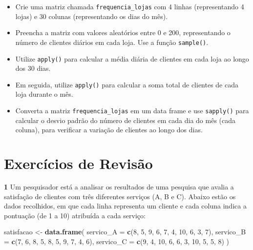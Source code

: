 \documentclass[
]{book}
\newenvironment{Shaded}{\begin{snugshade}}{\end{snugshade}}
\newcommand{\AttributeTok}[1]{\textcolor[rgb]{0.13,0.29,0.53}{#1}}
\newcommand{\DecValTok}[1]{\textcolor[rgb]{0.00,0.00,0.81}{#1}}
\newcommand{\FunctionTok}[1]{\textcolor[rgb]{0.13,0.29,0.53}{\textbf{#1}}}
\newcommand{\NormalTok}[1]{#1}
\newcommand{\OtherTok}[1]{\textcolor[rgb]{0.56,0.35,0.01}{#1}}
\providecommand{\tightlist}{%
  \setlength{\itemsep}{0pt}\setlength{\parskip}{0pt}}
\begin{document}
\begin{itemize}
\tightlist
\item
  Crie uma matriz chamada \texttt{frequencia\_lojas} com 4 linhas (representando 4 lojas) e 30 colunas (representando os dias do mês).
\item
  Preencha a matriz com valores aleatórios entre 0 e 200, representando o número de clientes diários em cada loja. Use a função \texttt{sample()}.
\item
  Utilize \texttt{apply()} para calcular a média diária de clientes em cada loja ao longo dos 30 dias.
\item
  Em seguida, utilize \texttt{apply()} para calcular a soma total de clientes de cada loja durante o mês.
\item
  Converta a matriz \texttt{frequencia\_lojas} em um data frame e use \texttt{sapply()} para calcular o desvio padrão do número de clientes em cada dia do mês (cada coluna), para verificar a variação de clientes ao longo dos dias.
\end{itemize}

\chapter{Exercícios de Revisão}\label{exercuxedcios-de-revisuxe3o}

\textbf{1} Um pesquisador está a analisar os resultados de uma pesquisa que avalia a satisfação de clientes com três diferentes serviços (A, B e C). Abaixo estão os dados recolhidos, em que cada linha representa um cliente e cada coluna indica a pontuação (de 1 a 10) atribuída a cada serviço:

\begin{Shaded}
\begin{Highlighting}[]
\NormalTok{satisfacao }\OtherTok{\textless{}{-}} \FunctionTok{data.frame}\NormalTok{(}
  \AttributeTok{servico\_A =} \FunctionTok{c}\NormalTok{(}\DecValTok{8}\NormalTok{, }\DecValTok{5}\NormalTok{, }\DecValTok{9}\NormalTok{, }\DecValTok{6}\NormalTok{, }\DecValTok{7}\NormalTok{, }\DecValTok{4}\NormalTok{, }\DecValTok{10}\NormalTok{, }\DecValTok{6}\NormalTok{, }\DecValTok{3}\NormalTok{, }\DecValTok{7}\NormalTok{),}
  \AttributeTok{servico\_B =} \FunctionTok{c}\NormalTok{(}\DecValTok{7}\NormalTok{, }\DecValTok{6}\NormalTok{, }\DecValTok{8}\NormalTok{, }\DecValTok{5}\NormalTok{, }\DecValTok{8}\NormalTok{, }\DecValTok{5}\NormalTok{, }\DecValTok{9}\NormalTok{, }\DecValTok{7}\NormalTok{, }\DecValTok{4}\NormalTok{, }\DecValTok{6}\NormalTok{),}
  \AttributeTok{servico\_C =} \FunctionTok{c}\NormalTok{(}\DecValTok{9}\NormalTok{, }\DecValTok{4}\NormalTok{, }\DecValTok{10}\NormalTok{, }\DecValTok{6}\NormalTok{, }\DecValTok{6}\NormalTok{, }\DecValTok{3}\NormalTok{, }\DecValTok{10}\NormalTok{, }\DecValTok{5}\NormalTok{, }\DecValTok{5}\NormalTok{, }\DecValTok{8}\NormalTok{)}
\NormalTok{)}
\end{Highlighting}
\end{Shaded}
\end{document}
